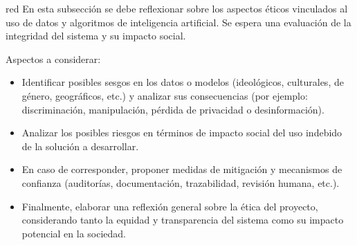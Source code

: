 \begin{consigna}{red}
En esta subsección se debe reflexionar sobre los aspectos éticos vinculados al uso de datos y algoritmos de inteligencia artificial. Se espera una evaluación de la integridad del sistema y su impacto social.

Aspectos a considerar:

\begin{itemize}
	\item Identificar posibles sesgos en los datos o modelos (ideológicos, culturales, de género, geográficos, etc.) y analizar sus consecuencias (por ejemplo: discriminación, manipulación, pérdida de privacidad o desinformación).
	\item Analizar los posibles riesgos en términos de impacto social del uso indebido de la solución a desarrollar.
	\item En caso de corresponder, proponer medidas de mitigación y mecanismos de confianza (auditorías, documentación, trazabilidad, revisión humana, etc.).
	\item Finalmente, elaborar una reflexión general sobre la ética del proyecto, considerando tanto la equidad y transparencia del sistema como su impacto potencial en la sociedad.

\end{itemize}
\end{consigna}
